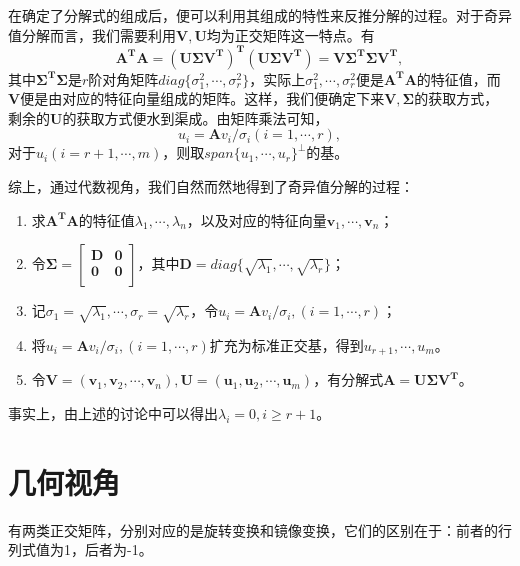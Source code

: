 \documentclass[12pt, a4paper, oneside]{ctexart}
\theoremstyle{remark}
\theoremstyle{definition}
\theoremstyle{definition}
\theoremstyle{plain}
\begin{document}
在确定了分解式的组成后，便可以利用其组成的特性来反推分解的过程。对于奇异值分解而言，我们需要利用$\bm{V},\bm{U}$均为正交矩阵这一特点。有
\[\bm{A^TA}=\bm{(U\Sigma V^T)^T(U\Sigma V^T)}=\bm{V\Sigma^T\Sigma V^T},\]
其中$\bm{\Sigma^T\Sigma}$是$r$阶对角矩阵$diag\{\sigma_1^2,\cdots,\sigma_r^2\}$，实际上$\sigma_1^2,\cdots,\sigma_r^2$便是$\bm{A^TA}$的特征值，而
$\bm{V}$便是由对应的特征向量组成的矩阵。这样，我们便确定下来$\bm{V},\bm{\Sigma}$的获取方式，剩余的$\bm{U}$的获取方式便水到渠成。由矩阵乘法可知，
\[u_i=\bm{A}v_i/\sigma_i(i=1,\cdots,r),\]
对于$u_i(i=r+1,\cdots,m)$，则取$span\{u_1,\cdots,u_r\}^{\perp}$的基。


综上，通过代数视角，我们自然而然地得到了奇异值分解的过程：
\begin{enumerate}
    \item 求$\bm{A^TA}$的特征值$\lambda_1,\cdots,\lambda_n$，以及对应的特征向量$\bm{v}_1,\cdots,\bm{v}_n$；
    \item 令$\bm{\Sigma} = \begin{bmatrix}
        \bm{D}&\bm{0}\\
        \bm{0}&\bm{0}\\
    \end{bmatrix}$，其中$\bm{D}=diag\{\sqrt{\lambda_1},\cdots,\sqrt{\lambda_r}\}$；
    \item 记$\sigma_1=\sqrt{\lambda_1},\cdots,\sigma_r=\sqrt{\lambda_r}$，令$u_i=\bm{A}v_i/\sigma_i,(i=1,\cdots,r)$；
    \item 将$u_i=\bm{A}v_i/\sigma_i,(i=1,\cdots,r)$扩充为标准正交基，得到$u_{r+1},\cdots,u_m$。
    \item 令$\bm{V}=(\bm{v}_1,\bm{v}_2,\cdots,\bm{v}_n),\bm{U}=(\bm{u}_1,\bm{u}_2,\cdots,\bm{u}_m)$，有分解式$\bm{A}=\bm{U\Sigma V^T}$。
\end{enumerate}
事实上，由上述的讨论中可以得出$\lambda_{i}=0,i\geq r+1$。
\section{几何视角}
有两类正交矩阵，分别对应的是旋转变换和镜像变换，它们的区别在于：前者的行列式值为1，后者为-1。
\end{document}
